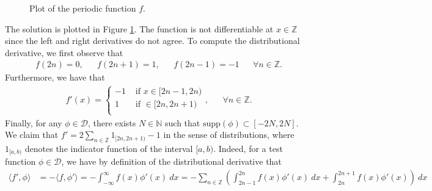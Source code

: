 \documentclass[11pt]{article}
\begin{document}
\begin{solution}
    \begin{figure}
    \centering
    \caption{Plot of the periodic function $f$.}
    \label{fig:ex5}
    \end{figure}
    The solution is plotted in Figure \ref{fig:ex5}. The function is not differentiable at $x \in \mathbb{Z}$ since the left and right derivatives do not agree.
     To compute the distributional derivative, we first observe that 
    \begin{align}
        f(2n) = 0, & & f(2n + 1) = 1, & & f(2n - 1) = -1 & & \forall n \in \mathbb{Z}.
    \end{align}
    Furthermore, we have that
    \begin{align}
        f'(x) = \begin{cases}
                -1 & \text{ if } x \in [2n - 1, 2n) \\
                 1 & \text{ if }  \in [2n, 2n + 1) \\
                \end{cases}, & & \forall n \in \mathbb{Z}.
    \end{align}
    Finally, for any $\phi \in \mathcal{D}$, there exists $N \in \mathbb{N}$ such that $\mathrm{supp}(\phi) \subset [-2N, 2N]$.\\
    We claim that $f' = 2 \sum_{n \in \mathbb{Z}} 1_{[2n, 2n + 1)} - 1$ in the sense of distributions, where $1_{[a,b)}$ denotes the indicator function of the interval $[a,b)$.
    Indeed, for a test function $\phi \in \mathcal{D}$, we have by definition of the distributional derivative that
    \begin{align*}
        \langle f', \phi \rangle &= - \langle f, \phi' \rangle = - \int_{-\infty}^{\infty} f(x) \phi'(x) \ dx = - \sum_{n \in \mathbb{Z}} \left ( \int_{2n - 1}^{2n} f(x) \phi'(x) \ dx + \int_{2n}^{2n + 1} f(x) \phi'(x)  \right)\ dx \\

\end{align*}
\end{solution}
\end{document}

